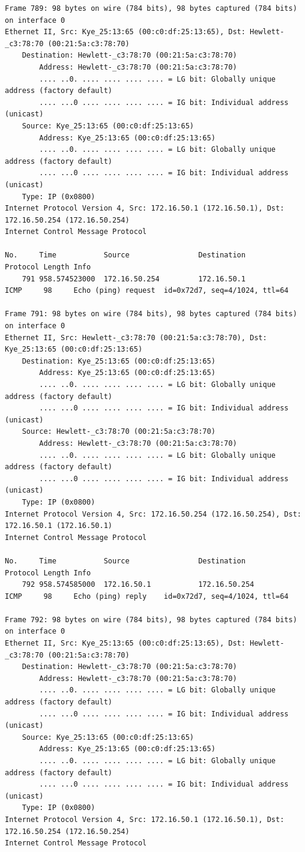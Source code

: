 \documentclass[a4paper,11pt]{article}
\begin{document}
\begin{lstlisting}
Frame 789: 98 bytes on wire (784 bits), 98 bytes captured (784 bits) on interface 0
Ethernet II, Src: Kye_25:13:65 (00:c0:df:25:13:65), Dst: Hewlett-_c3:78:70 (00:21:5a:c3:78:70)
    Destination: Hewlett-_c3:78:70 (00:21:5a:c3:78:70)
        Address: Hewlett-_c3:78:70 (00:21:5a:c3:78:70)
        .... ..0. .... .... .... .... = LG bit: Globally unique address (factory default)
        .... ...0 .... .... .... .... = IG bit: Individual address (unicast)
    Source: Kye_25:13:65 (00:c0:df:25:13:65)
        Address: Kye_25:13:65 (00:c0:df:25:13:65)
        .... ..0. .... .... .... .... = LG bit: Globally unique address (factory default)
        .... ...0 .... .... .... .... = IG bit: Individual address (unicast)
    Type: IP (0x0800)
Internet Protocol Version 4, Src: 172.16.50.1 (172.16.50.1), Dst: 172.16.50.254 (172.16.50.254)
Internet Control Message Protocol

No.     Time           Source                Destination           Protocol Length Info
    791 958.574523000  172.16.50.254         172.16.50.1           ICMP     98     Echo (ping) request  id=0x72d7, seq=4/1024, ttl=64

Frame 791: 98 bytes on wire (784 bits), 98 bytes captured (784 bits) on interface 0
Ethernet II, Src: Hewlett-_c3:78:70 (00:21:5a:c3:78:70), Dst: Kye_25:13:65 (00:c0:df:25:13:65)
    Destination: Kye_25:13:65 (00:c0:df:25:13:65)
        Address: Kye_25:13:65 (00:c0:df:25:13:65)
        .... ..0. .... .... .... .... = LG bit: Globally unique address (factory default)
        .... ...0 .... .... .... .... = IG bit: Individual address (unicast)
    Source: Hewlett-_c3:78:70 (00:21:5a:c3:78:70)
        Address: Hewlett-_c3:78:70 (00:21:5a:c3:78:70)
        .... ..0. .... .... .... .... = LG bit: Globally unique address (factory default)
        .... ...0 .... .... .... .... = IG bit: Individual address (unicast)
    Type: IP (0x0800)
Internet Protocol Version 4, Src: 172.16.50.254 (172.16.50.254), Dst: 172.16.50.1 (172.16.50.1)
Internet Control Message Protocol

No.     Time           Source                Destination           Protocol Length Info
    792 958.574585000  172.16.50.1           172.16.50.254         ICMP     98     Echo (ping) reply    id=0x72d7, seq=4/1024, ttl=64

Frame 792: 98 bytes on wire (784 bits), 98 bytes captured (784 bits) on interface 0
Ethernet II, Src: Kye_25:13:65 (00:c0:df:25:13:65), Dst: Hewlett-_c3:78:70 (00:21:5a:c3:78:70)
    Destination: Hewlett-_c3:78:70 (00:21:5a:c3:78:70)
        Address: Hewlett-_c3:78:70 (00:21:5a:c3:78:70)
        .... ..0. .... .... .... .... = LG bit: Globally unique address (factory default)
        .... ...0 .... .... .... .... = IG bit: Individual address (unicast)
    Source: Kye_25:13:65 (00:c0:df:25:13:65)
        Address: Kye_25:13:65 (00:c0:df:25:13:65)
        .... ..0. .... .... .... .... = LG bit: Globally unique address (factory default)
        .... ...0 .... .... .... .... = IG bit: Individual address (unicast)
    Type: IP (0x0800)
Internet Protocol Version 4, Src: 172.16.50.1 (172.16.50.1), Dst: 172.16.50.254 (172.16.50.254)
Internet Control Message Protocol


\end{lstlisting}
\end{document}
